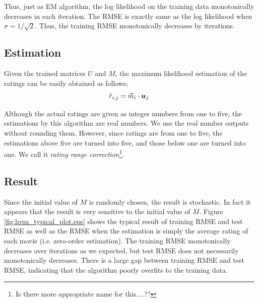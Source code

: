 \documentclass{article}
\begin{document}
Thus, just as EM algorithm, the log likelihood on the training data monotonically decreases in each iteration. The RMSE is exactly same as the log likelihood when $\sigma = 1/\sqrt{2}$. Thus, the training RMSE monotonically decreases by iterations.

\subsection{Estimation}
Given the trained matrices $U$ and $M$, the maximum likelihood estimation of the ratings can be easily obtained as follows;
\begin{equation}
\hat{r}_{i,j}=\vec{m}_i \cdot {{ \mbox{\boldmath $u$} }}_j
\end{equation}

Although the actual ratings are given as integer numbers from one to five, the estimations by this algorithm are real numbers. We use the real number outputs without rounding them. However, since ratings are from one to five, the estimations above five are turned into five, and those below one are turned into one. We call it \textit{rating range correction}\footnote{Is there more appropriate name for this....??}.

\subsection{Result}

Since the initial value of $M$ is randomly chosen, the result is stochastic. In fact it appears that the result is very sensitive to the initial value of $M$. Figure \ref{fig:lrem_typical_plot.eps} shows the typical result of training RMSE and test RMSE as well as the RMSE when the estimation is simply the average rating of each movie (i.e. zero-order estimation). The training RMSE monotonically decreases over iterations as we expected, but test RMSE does not necessarily monotonically decreases. There is a large gap between training RMSE and test RMSE, indicating that the algorithm poorly overfits to the training data.
\end{document}
